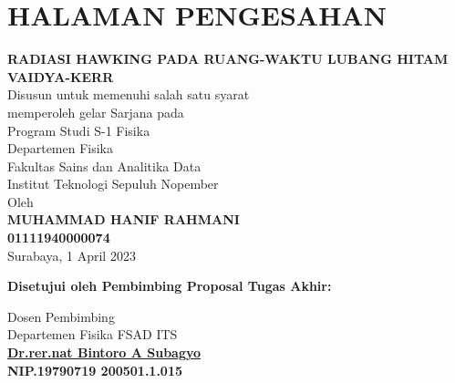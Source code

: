 \section*{\centering\large{HALAMAN PENGESAHAN}}
\vspace{0.08in}
\begin{center}
\textbf{\large{RADIASI HAWKING PADA RUANG-WAKTU LUBANG HITAM VAIDYA-KERR}}\\
\vspace{0.08in}
Disusun untuk memenuhi salah satu syarat \\
memperoleh gelar Sarjana pada\\ 
Program Studi S-1 Fisika\\
Departemen Fisika \\
Fakultas Sains dan Analitika Data\\
Institut Teknologi Sepuluh Nopember \\
\vspace{15mm}
 Oleh \\
\vspace{1mm}
\textbf{MUHAMMAD HANIF RAHMANI} \\
\vspace{1mm}
\textbf{01111940000074} \\

\vspace{0.3in}
Surabaya, 1 April 2023
\end{center}
\vspace{0.3in}
\begin{center}
	\textbf{Disetujui oleh Pembimbing Proposal Tugas Akhir:} \\
	\vspace{2mm}
 \end{center}
	\begin{center}
\vspace{2mm}
	    Dosen Pembimbing \\
	    Departemen Fisika FSAD ITS \\
	    \vspace{0.8in}
	    \textbf{\underline{Dr.rer.nat Bintoro A Subagyo}} \\	
	    \textbf{NIP.19790719 200501.1.015} \\
\end{center}

